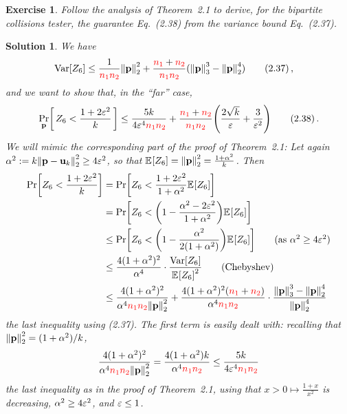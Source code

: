 \documentclass[biber,plain]{nowfnt} %
\newtheorem{question}{Exercise}[chapter]
\newtheorem{solution}{Solution}[chapter]
\newcommand{\nss}{\textcolor{red}{\ns_1}}
\newcommand{\nst}{\textcolor{red}{\ns_2}}
\newcommand{\nss}{\ns_1}
\newcommand{\nst}{\ns_2}
\begin{document}
\begin{question}\label{ex:uniformity:bipartite}
  Follow the analysis of Theorem~2.1 to derive, for the bipartite collisions tester, the guarantee Eq.~(2.38) from the variance bound Eq.~(2.37).
\end{question}
\begin{solution}
We have
\begin{align}
  \Var[Z_6] 
  &\leq \frac{1}{\nss\nst}\normtwo{\p}^2 + \frac{\nss+\nst}{\nss\nst}(\norm{\p}_3^3-\normtwo{\p}^4) \tag{2.37}\,,
\end{align}
and we want to show that, in the ``far'' case,
\begin{align}
  \probaDistrOf{\p}{ Z_6 < \frac{1+2\dst^2}{\ab} }
  \leq \frac{5\ab}{4\dst^4\nss\nst} + \frac{\nss+\nst}{\nss\nst}\Paren{\frac{2\sqrt{\ab}}{\dst}+\frac{3}{\dst^2}} \tag{2.38}\,.
\end{align}
We will mimic the corresponding part of the proof of Theorem~2.1:
Let again $\alpha^2 \eqdef \ab\normtwo{\p-\uniform_\ab}^2 \geq 4\dst^2$, so that $\bEE{Z_6} = \normtwo{\p}^2 = \frac{1+\alpha^2}{\ab}$. Then
    \begin{align*}
      \bPr{Z_6 < \frac{1+2\dst^2}{\ab}} 
      &= \bPr{Z_6 < \frac{1+2\dst^2}{1+\alpha^2}\bEE{Z_6}} \\
      &= \bPr{Z_6 < \Paren{1-\frac{\alpha^2-2\dst^2}{1+\alpha^2}}\bEE{Z_6}} \\
      &\leq \bPr{Z_6 < \Paren{1-\frac{\alpha^2}{2(1+\alpha^2)}}\bEE{Z_6}} \tag{as $\alpha^2 \geq 4\dst^2$}\\
      &\leq \frac{4(1+\alpha^2)^2}{\alpha^4}\cdot \frac{\Var[Z_6]}{\bEE{Z_6}^2} \tag{Chebyshev}\\
      &\leq \frac{4(1+\alpha^2)^2}{\alpha^4\nss\nst\normtwo{\p}^2} + \frac{4(1+\alpha^2)^2(\nss+\nst)}{\alpha^4\nss\nst}\cdot \frac{\norm{\p}_3^3-\normtwo{\p}^4}{\normtwo{\p}^4} 
    \end{align*}
    the last inequality using (2.37). The first term is easily dealt with: recalling that $\normtwo{\p}^2 = (1+\alpha^2)/\ab$,
    \[
        \frac{4(1+\alpha^2)^2}{\alpha^4\nss\nst\normtwo{\p}^2} = \frac{4(1+\alpha^2)\ab}{\alpha^4\nss\nst} \leq \frac{5\ab}{4\dst^4\nss\nst}
    \]
    the last inequality as in the proof of Theorem~2.1, using that $x>0 \mapsto \frac{1+x}{x^2}$ is decreasing, $\alpha^2\geq 4\varepsilon^2$, and $\varepsilon \leq 1$.
    

\end{solution}
\end{document}
